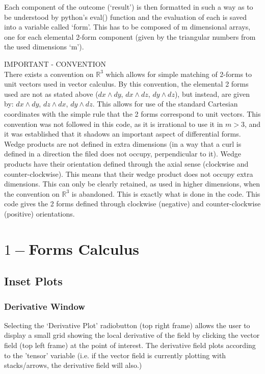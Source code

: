 \documentclass[12pt]{report}
\begin{document}
Each component of the outcome (`result') is then formatted in such a way as to be understood by python's eval() function and the evaluation of each is saved into a variable called `form'. This has to be composed of m dimensional arrays, one for each elemental 2-form component (given by the triangular numbers from the used dimensions `m').

\begin{center}
	\Large
	IMPORTANT - CONVENTION\\
	\normalsize
	There exists a convention on $\mathbb{R}^{3}$ which allows for simple matching of 2-forms to unit vectors used in vector calculus. By this convention, the elemental 2 forms used are not as stated above ($ dx \wedge dy$, $ dx \wedge dz$, $ dy \wedge dz$), but instead, are given by: $dx \wedge dy$, $ dz \wedge dx$, $ dy \wedge dz$. This allows for use of the standard Cartesian coordinates with the simple rule that the 2 forms correspond to unit vectors. This convention was not followed in this code, as it is irrational to use it in $m>3$, and it was established that it shadows an important aspect of differential forms. Wedge products are not defined in extra dimensions (in a way that a curl is defined in a direction the filed does not occupy, perpendicular to it). Wedge products have their orientation defined through the axial sense (clockwise and counter-clockwise). This means that their wedge product does not occupy extra dimensions. This can only be clearly retained, as used in higher dimensions, when the convention on $\mathbb{R}^{3}$ is abandoned. This is exactly what is done in the code. This code gives the 2 forms defined through clockwise (negative) and counter-clockwise (positive) orientations.
\end{center}

\chapter{$1-$Forms Calculus}
\section{Inset Plots}
\subsection{Derivative Window}
Selecting the `Derivative Plot' radiobutton (top right frame) allows the user to display a small grid showing the local derivative of the field by clicking the vector field (top left frame) at the point of interest. The derivative field plots according to the 'tensor' variable (i.e. if the vector field is currently plotting with stacks/arrows, the derivative field will also.)
\end{document}
